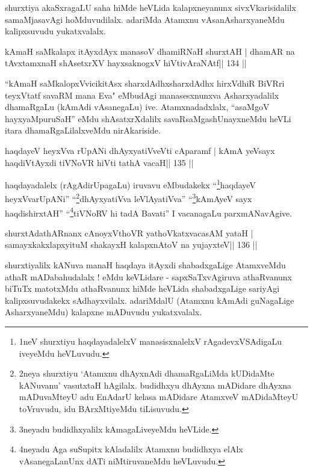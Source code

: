 \begin{artha}
shurxtiya akaSxragaLU saha hiMde heVLida kalapxneyanunx sivxVkarisidalilx samaMjasavAgi hoMduvudilalx. adariMda Atamxnu vAsanAsharxyaneMdu kalipxsuvudu yukatxvalalx.
\end{artha}

\begin{shl}
kAmaH saMkalapx itAyxdAyx manasoV dhamiRNaH shurxtAH |
dhamAR na tAvxtamxnaH shAsetxrXV hayxsaknogxV hiVtivAraNAtf\hfill || 134 ||
\end{shl}

\begin{artha}
``kAmaH saMkalopxVvicikitAsx sharxdAdhx\s sharxdAdhx hirxVdhiR BiVRri
  teyxVtatf savaRM mana Eva" eMbudAgi manasesxnunxva Asharxyadalilx
  dhamaRgaLu (kAmAdi vAsanegaLu) ive. Atamxnadadxlalx,
  ``asaMgoV hayxyaMpuruSaH'' eMdu shAsatxrXdalilx savaRsaMgashUnayxneMdu heVLi itara dhamaRgaLilalxveMdu nirAkariside.
\end{artha}

\begin{shl}
haqdayeV heyxVva rUpANi dhAyxyatiVveVti cAparamf |
kAmA yeV\s sayx haqdiVtAyxdi tiVNoVR hiVti tathA vacaH\hfill || 135 ||
\end{shl}

\begin{artha}
haqdayadalelx (rAgAdirUpagaLu) iruvavu
eMbudakekx ``\footnote{1neV shurxtiyu haqdayadalelxV manasisxnalelxV
  rAgadevxVSAdigaLu iveyeMdu heVLuvudu.}haqdayeV heyxVvarUpANi''
``\footnote{2neya shurxtiyu `Atamxnu dhAyxnAdi dhamaRgaLiMda
  kUDidaMte kANuvanu' vasutxtaH hAgilalx. budidhxyu dhAyxna mADidare
  dhAyxna mADuvaMteyU adu EnAdarU kelasa mADidare AtamxveV mADidaMteyU
  toVruvudu, idu BArxMtiyeMdu tiLisuvudu.}dhAyxyatiVva leVlAyatiVva''
``\footnote{3neyadu budidhxyalilx kAmagaLiveyeMdu heVLide.}kAmAyeV\s
sayx haqdishirxtAH''  ``\footnote{4neyadu Aga suSupitx kAladalilx
  Atamxnu budidhxya elAlx vAsanegaLanUnx dATi niMtiruvaneMdu 
  heVLuvudu.}tiVNoRV hi tadA Bavati'' I vacanagaLu
parxmANavAgive.
\end{artha}

\begin{shl}
shurxtAdathARnanx cAnoyxV\s thoVR yathoVkatxvacasAM yataH |
samayxkakxlapxyituM shakayxH kalapxnA\s toV na yujayxteV\hfill || 136 ||
\end{shl}

\begin{artha}
shurxtiyalilx kANuva manaH haqdaya itAyxdi shabadxgaLige AtamxveMdu   athaR mADabahudalalx ! eMdu keVLidare - sapxSaTxvAgiruva athaRvanunx   biTuTx matotxMdu athaRvanunx hiMde heVLida shabadxgaLige sariyAgi   kalipxsuvudakekx sAdhayxvilalx. adariMdalU (Atamxnu kAmAdi guNagaLige   AsharxyaneMdu) kalapxne mADuvudu yukatxvalalx.
\end{artha}

